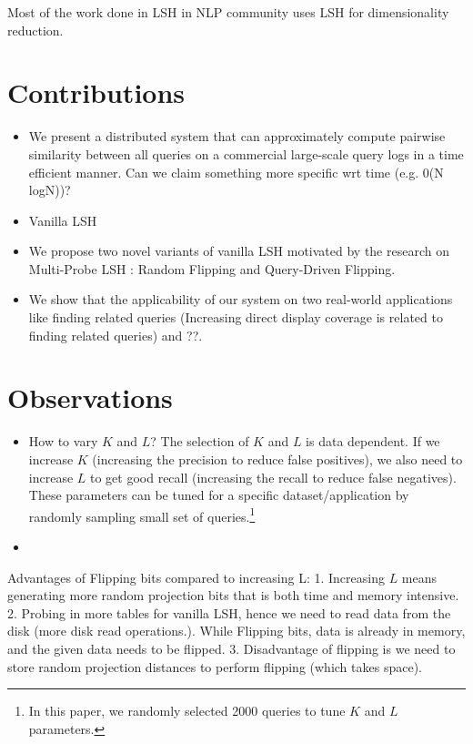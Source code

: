 
Most of the work done in LSH in NLP community uses LSH for dimensionality reduction. 

\section{Contributions}
\begin{itemize}
\item We present a distributed system that can approximately compute pairwise similarity 
between all queries on a commercial large-scale query logs in a time efficient manner. 
Can we claim something more specific wrt time (e.g. 0(N logN))?
\item Vanilla LSH 
\item We propose two novel variants of vanilla LSH motivated by the research on Multi-Probe LSH \cite{LvVLDB07}: Random Flipping and Query-Driven Flipping. 
\item  We show that the applicability of our system on two real-world applications like finding related queries (Increasing  direct display coverage is related to finding related queries) and ??.
\end{itemize}


\section{Observations}
\begin{itemize}
\item How to vary $K$ and $L$? The selection of $K$ and $L$ is data dependent. 
If we increase $K$ (increasing the precision to reduce false positives), we also need to 
increase $L$ to get good recall (increasing the recall to reduce false negatives). 
These parameters can be tuned for a specific dataset/application by randomly sampling small set of queries.\footnote{In this paper, we randomly selected 2000 queries to tune $K$ and $L$ parameters.}
\item 

\end{itemize} 

Advantages of Flipping bits compared to increasing L:
1. Increasing $L$ means generating more random projection bits that is both time and memory intensive.   
2. Probing in more tables for vanilla LSH, hence we need to read data from the disk (more disk read operations.). While Flipping bits, data is
already in memory, and the given data needs to be flipped.
3. Disadvantage of flipping is we need to store random projection distances to perform flipping (which takes space).


